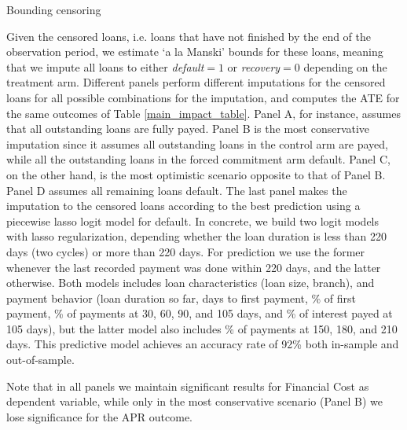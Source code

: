 \vspace{.3in}
\begin{table}[H]
\caption{Bounding censoring} 
\label{bounding_censoring}
\begin{center}
\resizebox{0.9\textwidth}{!}{
\scriptsize{}
}
\end{center}
 
\end{table}
 \scriptsize 
 Given the censored loans, i.e. loans that have not finished by the end of the observation period, we estimate `a la Manski' bounds for these loans, meaning that we impute all loans to either \emph{default}$=1$ or \emph{recovery}$=0$ depending on the treatment arm. Different panels perform different imputations for the censored loans for all possible combinations for the imputation, and computes the ATE for the same outcomes of Table \ref{main_impact_table}. Panel A, for instance, assumes that all outstanding loans are fully payed. Panel B is the most conservative imputation since it assumes all outstanding loans in the control arm are payed, while all the outstanding loans in the forced commitment arm default. Panel C, on the other hand, is the most optimistic scenario opposite to that of Panel B. Panel D assumes all remaining loans default. The last panel makes the imputation to the censored loans according to the best prediction using a piecewise lasso logit model for default. In concrete, we build two logit models with lasso regularization, depending whether the loan duration is less than 220 days (two cycles) or more than 220 days. For prediction we use the former whenever the last recorded payment was done within 220 days, and the latter otherwise. Both models includes loan characteristics (loan size, branch), and payment behavior (loan duration so far, days to first payment, \% of first payment, \% of payments at 30, 60, 90, and 105 days, and \% of interest payed at 105 days), but the latter model also includes \% of payments at 150, 180, and 210 days. This predictive model achieves an accuracy rate of 92\% both in-sample and out-of-sample.

 Note that in all panels we maintain significant results for Financial Cost as dependent variable, while only in the most conservative scenario (Panel B) we lose significance for the APR outcome. 
 
